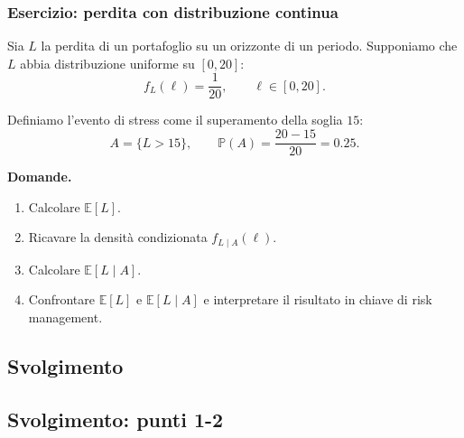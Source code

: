 \documentclass[handout]{beamer}%
\providecommand{\E}{\mathbb{E}}
\providecommand{\Prob}{\mathbb{P}}
\providecommand{\1}{\mathbf{1}}
\providecommand{\QTR}[2]{\csname #1\endcsname{#2}}
\begin{document}
\begin{frame}%
%

\frametitle{Esercizio: perdita con distribuzione continua}%
%

%


Sia $L$ la perdita di un portafoglio su un orizzonte di un periodo. Supponiamo
che $L$ abbia distribuzione uniforme su $[0,20]$:
\[
f_{L}(\ell) = \frac{1}{20}, \qquad\ell\in[0,20].
\]


Definiamo l'evento di stress come il superamento della soglia $15$:
\[
A = \{L > 15\}, \qquad\Prob(A) = \frac{20-15}{20} = 0.25.
\]


\medskip

\textbf{Domande.}

\begin{enumerate}
\item Calcolare $\E[L]$.

\item Ricavare la densit\`{a} condizionata $f_{L\mid A}(\ell)$.

\item Calcolare $\E[L\mid A]$.

\item Confrontare $\E[L]$ e $\E[L\mid A]$ e interpretare il risultato in
chiave di risk management.
\end{enumerate}%

\transboxout
\end{frame}%


\subsection{Svolgimento}

\subsection{Svolgimento: punti 1-2}%
\end{document}
